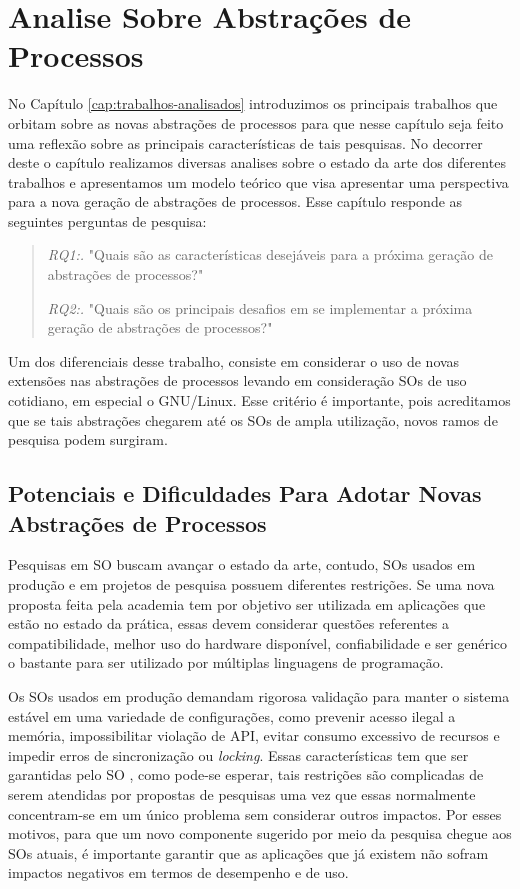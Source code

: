 \chapter{Analise Sobre Abstrações de Processos}
\label{cap:analise-sobre-abstracoes-de-processos}

No Capítulo \ref{cap:trabalhos-analisados} introduzimos os principais trabalhos
que orbitam sobre as novas abstrações de processos para que nesse capítulo seja
feito uma reflexão sobre as principais características de tais pesquisas. No
decorrer deste o capítulo realizamos diversas analises sobre o estado da arte
dos diferentes trabalhos e apresentamos um modelo teórico que visa apresentar
uma perspectiva para a nova geração de abstrações de processos.  Esse capítulo
responde as seguintes perguntas de pesquisa:

\begin{quote}
 \item \textit{RQ1:.} "Quais são as características desejáveis para a próxima geração de abstrações de processos?"
 \item \textit{RQ2:.} "Quais são os principais desafios em se implementar a próxima geração de abstrações de processos?"
\end{quote}

Um dos diferenciais desse trabalho, consiste em considerar o uso de novas
extensões nas abstrações de processos levando em consideração SOs de uso
cotidiano, em especial o GNU/Linux. Esse critério é importante, pois
acreditamos que se tais abstrações chegarem até os SOs de ampla utilização,
novos ramos de pesquisa podem surgiram.

\section{Potenciais e Dificuldades Para Adotar Novas Abstrações de Processos}
\label{sec:potenciais}

Pesquisas em SO buscam avançar o estado da arte, contudo, SOs
usados em produção e em projetos de pesquisa possuem diferentes restrições. Se
uma nova proposta feita pela academia tem por objetivo ser utilizada em
aplicações que estão no estado da prática, essas devem considerar questões
referentes a compatibilidade, melhor uso do hardware disponível, confiabilidade
e ser genérico o bastante para ser utilizado por múltiplas linguagens de
programação.

Os SOs usados em produção demandam rigorosa validação para manter o sistema
estável em uma variedade de configurações, como prevenir acesso ilegal a
memória, impossibilitar violação de API, evitar consumo excessivo de recursos e
impedir erros de sincronização ou \textit{locking}. Essas características tem
que ser garantidas pelo SO \citep{mondrix}, como pode-se esperar, tais
restrições são complicadas de serem atendidas por propostas de pesquisas uma
vez que essas normalmente concentram-se em um único problema sem considerar
outros impactos.  Por esses motivos, para que um novo componente sugerido por
meio da pesquisa chegue aos SOs atuais, é importante garantir que as aplicações
que já existem não sofram impactos negativos em termos de desempenho e de uso.

